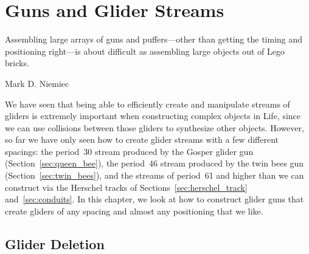 
\renewcommand{\chapterfolder}{glider_guns/}
\chapter{Guns and Glider Streams}\label{chp:guns}


\vspace*{-0.4in}
\epigraph{Assembling large arrays of guns and puffers---other than getting the timing and positioning right---is about difficult as assembling large objects out of Lego bricks.}{Mark D. Niemiec}
\vspace*{0.4in}


\noindent We have seen that being able to efficiently create and manipulate streams of gliders is extremely important when constructing complex objects in Life, since we can use collisions between those gliders to synthesize other objects. However, so far we have only seen how to create glider streams with a few different spacings: the period~30 stream produced by the Gosper glider gun (Section~\ref{sec:queen_bee}), the period~46 stream produced by the twin bees gun (Section~\ref{sec:twin_bees}), and the streams of period~61 and higher than we can construct via the Herschel tracks of Sections~\ref{sec:herschel_track} and~\ref{sec:conduits}. In this chapter, we look at how to construct glider guns that create gliders of any spacing and almost any positioning that we like.

\section{Glider Deletion}\label{sec:glider_deletion}

